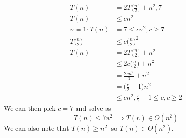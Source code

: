 \documentclass[12pt]{article}
\begin{document}
\begin{example}
\begin{align*}
T(n) &= 2T\bigg(\frac{n}{2}\bigg) + n^2, 7 \\
T(n) &\leq cn^2 \\
n = 1: T(n) &= 7 \leq cn^2, c \geq 7 \\
T\bigg(\frac{n}{2}\bigg) &\leq c\bigg(\frac{n}{2}\bigg)^2 \\
T(n) &= 2T\bigg(\frac{n}{2}\bigg) + n^2 \\
     &\leq 2c\bigg(\frac{n}{2}\bigg) + n^2 \\
     &= \frac{2cn^2}{4} + n^2 \\
     &= \bigg(\frac{c}{2} + 1\bigg)n^2 \\
     &\leq cn^2, \frac{c}{2} + 1 \leq c, c \geq 2
\end{align*}
We can then pick $c = 7$ and solve as \[ T(n) \leq 7n^2 \implies T(n) \in O(n^2) \] We can also note that $T(n) \geq n^2$, so $T(n) \in \Theta(n^2)$.
\end{example}
\end{document}
